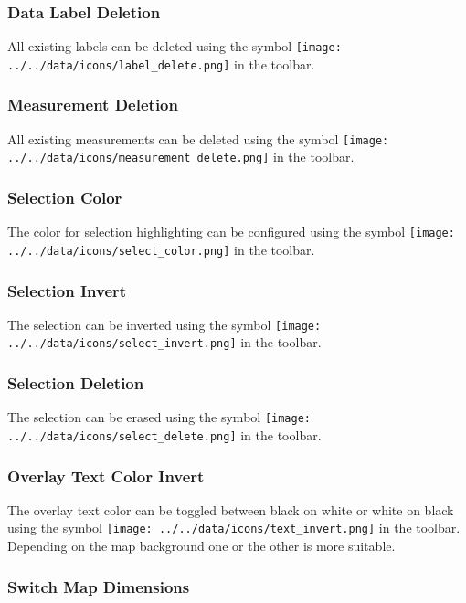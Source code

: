 \subsubsection{Data Label Deletion}

All existing labels can be deleted using the symbol \texttt{[image: ../../data/icons/label\_delete.png]} in the toolbar.

\subsubsection{Measurement Deletion}

All existing measurements can be deleted using the symbol \texttt{[image: ../../data/icons/measurement\_delete.png]} in the toolbar.

\subsubsection{Selection Color}

The color for selection highlighting can be configured using the symbol \texttt{[image: ../../data/icons/select\_color.png]} in the toolbar.

\subsubsection{Selection Invert}

The selection can be inverted using the symbol \texttt{[image: ../../data/icons/select\_invert.png]} in the toolbar.

\subsubsection{Selection Deletion}

The selection can be erased using the symbol \texttt{[image: ../../data/icons/select\_delete.png]} in the toolbar.

\subsubsection{Overlay Text Color Invert}

The overlay text color can be toggled between black on white or white on black using the symbol \texttt{[image: ../../data/icons/text\_invert.png]} in the toolbar. Depending on the map background one or the other is more suitable.

\subsubsection{Switch Map Dimensions}

